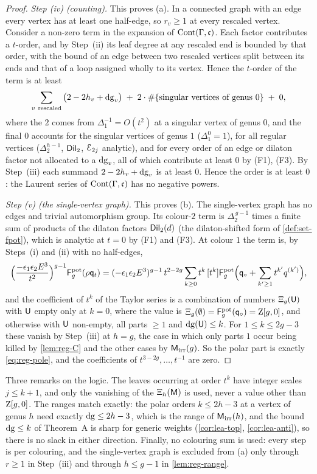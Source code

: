 \begin{proof}
\emph{Step (iv) (counting).} This proves (a). In a connected graph with an edge every vertex has at least one half-edge, so $r_v\geq 1$ at every rescaled vertex. Consider a non-zero term in the expansion of $\mathrm{Cont}(\Gamma,\mathfrak{c})$. Each factor contributes a $t$-order, and by Step~(ii) its leaf degree at any rescaled end is bounded by that order, with the bound of an edge between two rescaled vertices split between its ends and that of a loop assigned wholly to its vertex. Hence the $t$-order of the term is at least
\[
\sum_{v\ \mathrm{rescaled}}\big(2-2h_v+\regD_v\big)\;+\;2\cdot\#\{\text{singular vertices of genus }0\}\;+\;0,
\]
where the $2$ comes from $\Delta_1^{-1}=O(t^2)$ at a singular vertex of genus $0$, and the final $0$ accounts for the singular vertices of genus $1$ ($\Delta_1^0=1$), for all regular vertices ($\Delta_2^{h-1}$, $\mathsf{Dil}_2$, $\mathcal{E}_{2j}$ analytic), and for every order of an edge or dilaton factor not allocated to a $\mathrm{dg}_v$, all of which contribute at least $0$ by (F1), (F3). By Step~(iii) each summand $2-2h_v+\mathrm{dg}_v$ is at least $0$. Hence the order is at least $0$: the Laurent series of $\mathrm{Cont}(\Gamma,\mathfrak{c})$ has no negative powers.

\emph{Step (v) (the single-vertex graph).} This proves (b). The single-vertex graph has no edges and trivial automorphism group. Its colour-$2$ term is $\Delta_2^{\,g-1}$ times a finite sum of products of the dilaton factors $\mathsf{Dil}_2(d)$ (the dilaton-shifted form of \cref{def:set-fpot}), which is analytic at $t=0$ by (F1) and (F3). At colour $1$ the term is, by Steps~(i) and (ii) with no half-edges,
\[
\Big(\frac{-\epsilon_1\epsilon_2E^3}{t^2}\Big)^{g-1}\mathsf{F}^{\mathrm{pot}}_g(\rho\mathsf{q}_{t})
=(-\epsilon_1\epsilon_2E^3)^{g-1}\,t^{2-2g}\sum_{k\geq 0}t^k\,[t^k]\mathsf{F}^{\mathrm{pot}}_g\Big(\mathsf{q}_{\circ}+\sum_{k'\geq 1}t^{k'}q^{(k')}\Big),
\]
and the coefficient of $t^k$ of the Taylor series is a combination of numbers $\Xi_g(\mathsf{U})$ with $\mathsf{U}$ empty only at $k=0$, where the value is $\Xi_g(\emptyset)=\mathsf{F}^{\mathrm{pot}}_g(\mathsf{q}_{\circ})=\mathrm{Z}[g,0]$, and otherwise with $\mathsf{U}$ non-empty, all parts $\geq 1$ and $\mathrm{dg}(\mathsf{U})\leq k$. For $1\leq k\leq 2g-3$ these vanish by Step~(iii) at $h=g$, the case in which only parts $1$ occur being killed by \cref{lem:reg-C} and the other cases by $\mathsf{M}_{\mathrm{irr}}(g)$. So the polar part is exactly \eqref{eq:reg-pole}, and the coefficients of $t^{3-2g},\dots,t^{-1}$ are zero.
\end{proof}

Three remarks on the logic. The leaves occurring at order $t^k$ have integer scales $j\leq k+1$, and only the vanishing of the $\Xi_h(\mathsf{M})$ is used, never a value other than $\mathrm{Z}[g,0]$. The ranges match exactly: the polar orders $k\leq 2h-3$ at a vertex of genus $h$ need exactly $\mathrm{dg}\leq 2h-3$, which is the range of $\mathsf{M}_{\mathrm{irr}}(h)$, and the bound $\mathrm{dg}\leq k$ of Theorem~A is sharp for generic weights (\cref{cor:lea-top}, \cref{cor:lea-anti}), so there is no slack in either direction. Finally, no colouring sum is used: every step is per colouring, and the single-vertex graph is excluded from (a) only through $r\geq 1$ in Step~(iii) and through $h\leq g-1$ in \cref{lem:reg-range}.

